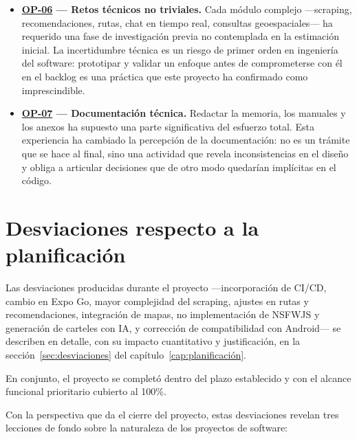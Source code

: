 \begin{itemize}
    \item \textbf{\hyperref[op:06]{OP-06} --- Retos técnicos no triviales.} Cada módulo complejo ---scraping, recomendaciones, rutas, chat en tiempo real, consultas geoespaciales--- ha requerido una fase de investigación previa no contemplada en la estimación inicial. La incertidumbre técnica es un riesgo de primer orden en ingeniería del software: prototipar y validar un enfoque antes de comprometerse con él en el backlog es una práctica que este proyecto ha confirmado como imprescindible.

    \item \textbf{\hyperref[op:07]{OP-07} --- Documentación técnica.} Redactar la memoria, los manuales y los anexos ha supuesto una parte significativa del esfuerzo total. Esta experiencia ha cambiado la percepción de la documentación: no es un trámite que se hace al final, sino una actividad que revela inconsistencias en el diseño y obliga a articular decisiones que de otro modo quedarían implícitas en el código.
\end{itemize}

\section{Desviaciones respecto a la planificación}

Las desviaciones producidas durante el proyecto ---incorporación de CI/CD, cambio en Expo Go, mayor complejidad del scraping, ajustes en rutas y recomendaciones, integración de mapas, no implementación de NSFWJS y generación de carteles con IA, y corrección de compatibilidad con Android--- se describen en detalle, con su impacto cuantitativo y justificación, en la sección~\ref{sec:desviaciones} del capítulo~\ref{cap:planificación}.

En conjunto, el proyecto se completó dentro del plazo establecido y con el alcance funcional prioritario cubierto al 100\%.

Con la perspectiva que da el cierre del proyecto, estas desviaciones revelan tres lecciones de fondo sobre la naturaleza de los proyectos de software:

